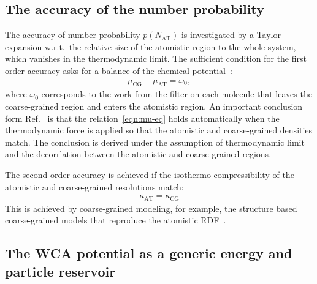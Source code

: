 \documentclass[epjST]{svjour}
\newcommand{\AT}[0]{\textrm{AT}}
\newcommand{\CG}[0]{\textrm{CG}}
\begin{document}
\subsection{The accuracy of the number probability}

The accuracy of number probability $p(N_\AT)$ is investigated by a
Taylor expansion w.r.t.~the relative size of the atomistic region to
the whole system, which vanishes in the thermodynamic limit. The sufficient condition for the first order accuracy
asks for a balance of the chemical potential~\cite{wang2013grand}:
\begin{align}\label{eqn:mu-eq}
  \mu_\CG - \mu_\AT = \omega_0,
\end{align}
where $\omega_0$ corresponds to the work from the filter on each
molecule that leaves the coarse-grained region and  enters the atomistic region. An important conclusion
form Ref.~\cite{wang2013grand} is that the relation~\eqref{eqn:mu-eq}
holds automatically when the thermodynamic force is applied so that the atomistic
and coarse-grained densities match. The conclusion is derived under
the assumption of thermodynamic limit and the decorrlation between the
atomistic and coarse-grained regions.

The second order accuracy is achieved if the isothermo-compressibility of the atomistic and coarse-grained resolutions match:
\begin{align}
  \kappa_\AT = \kappa_\CG
\end{align}
This is achieved by coarse-grained modeling, for example, the
structure based coarse-grained models that reproduce the atomistic
RDF~\cite{wang2009comparative}.

\subsection{The WCA potential as a generic energy and particle reservoir}
\end{document}
